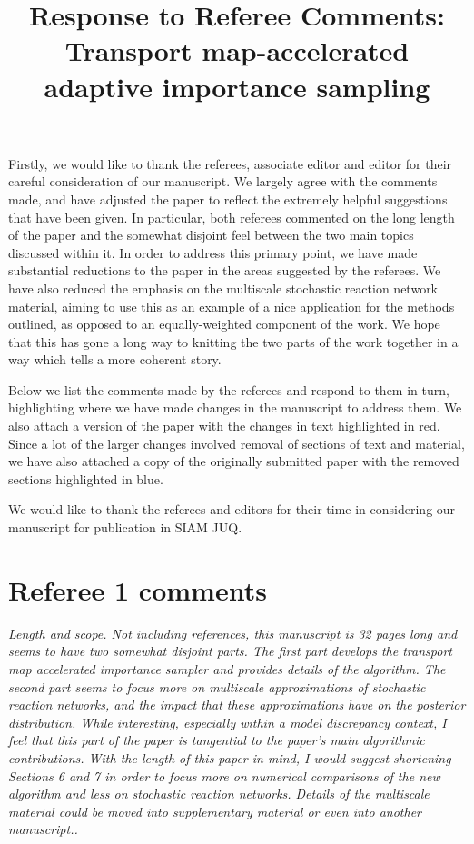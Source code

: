 \documentclass{article}
\newcommand{\comment}[2]{\vspace{0.6cm}{\bf Comment:} {\it #1.}

\vspace{0.3cm}{\bf Answer:} #2}
\begin{document}
\title{Response to Referee Comments: Transport map-accelerated adaptive importance sampling}
\maketitle

Firstly, we would like to thank the referees, associate editor and editor for their careful consideration of our manuscript. We largely agree with the comments made, and have adjusted the paper to reflect the extremely helpful suggestions that have been given. In particular, both referees commented on the long length of the paper and the somewhat disjoint feel between the two main topics discussed within it. In order to address this primary point, we have made substantial reductions to the paper in the areas suggested by the referees. We have also reduced the emphasis on the multiscale stochastic reaction network material, aiming to use this as an example of a nice application for the methods outlined, as opposed to an equally-weighted component of the work. We hope that this has gone a long way to knitting the two parts of the work together in a way which tells a more coherent story.

Below we list the comments made by the referees and respond to them in turn, highlighting where we have made changes in the manuscript to address them. We also attach a version of the paper with the changes in text highlighted in red. Since a lot of the larger changes involved removal of sections of text and material, we have also attached a copy of the originally submitted paper with the removed sections highlighted in blue.

We would like to thank the referees and editors for their time in considering our manuscript for publication in SIAM JUQ.


\section*{Referee 1 comments}

\comment{Length and scope. Not including references, this manuscript is 32 pages long and seems to have two somewhat disjoint parts. The first part develops the transport map accelerated importance sampler and provides details of the algorithm. The second part seems to focus more on multiscale approximations of stochastic reaction networks, and the impact that these approximations have on the posterior distribution. While interesting, especially within a model discrepancy context, I feel that this part of the paper is tangential to the paper's main algorithmic contributions. With the length of this paper in mind, I would suggest shortening Sections 6 and 7 in order to focus more on numerical comparisons of the new algorithm and less on stochastic reaction networks. Details of the multiscale material could be moved into supplementary material or even into another manuscript.}{}
\end{document}
